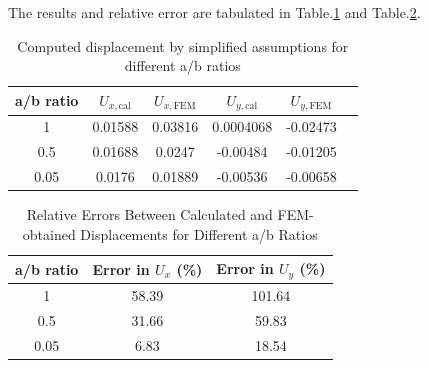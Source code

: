 \documentclass[twoside,twocolumn,10pt]{article}
\begin{document}
The results and relative error are tabulated in Table.\ref{tab:U_eaxvsfem} and Table.\ref{tab:U_relative_error}.

\begin{table}[h]
\centering
\begin{tabular}{cccccc}
\toprule
a/b ratio & \(U_{x,\text{cal}}\) & \(U_{x,\text{FEM}}\) & \(U_{y,\text{cal}}\) & \(U_{y,\text{FEM}}\) \\
\midrule
1 & 0.01588 & 0.03816 & 0.0004068 & -0.02473  \\
0.5 & 0.01688 & 0.0247 & -0.00484 & -0.01205 \\
0.05 & 0.0176 & 0.01889 & -0.00536 & -0.00658\\
\bottomrule
\end{tabular}
\caption{Computed displacement by simplified assumptions for different a/b ratios }
\label{tab:U_eaxvsfem}
\end{table}

\begin{table}[h]
\centering

\begin{tabular}{ccc}
\toprule
a/b ratio & Error in \( U_{x} \) (\%) & Error in \( U_{y} \) (\%) \\
\midrule
1 & 58.39 & 101.64 \\
0.5 & 31.66 & 59.83 \\
0.05 & 6.83 & 18.54 \\
\bottomrule
\end{tabular}
\caption{Relative Errors Between Calculated and FEM-obtained Displacements for Different a/b Ratios}
\label{tab:U_relative_error}
\end{table}
  
  
  



\end{document}
